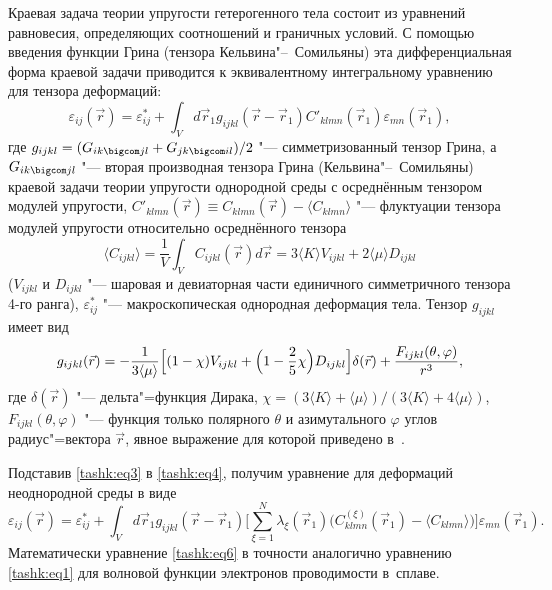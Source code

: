 Краевая задача теории упругости гетерогенного тела состоит из уравнений
равновесия, определяющих соотношений и граничных условий. С помощью введения
функции Грина (тензора Кельвина"--~Сомильяны) эта дифференциальная форма
краевой задачи приводится к эквивалентному интегральному уравнению для
тензора деформаций:
\begin{equation}
\label{tashk:eq4}
\varepsilon _{ij} (\vec {r})=\varepsilon _{ij}^\ast +\int_V d\vec
{r}_1 g_{ijkl} (\vec {r}-\vec {r}_1 )C'_{klmn} (\vec {r}_1 ) \varepsilon
_{mn} (\vec {r}_1 ),
\end{equation}
где $g_{ijkl} =(G_{ik\bigcom jl} +G_{jk\bigcom  il})/2$ "--- симметризованный тензор Грина, 
а $G_{ik \bigcom jl}$ "--- вторая производная тензора Грина (Кельвина"--~Сомильяны) краевой задачи теории упругости однородной среды с осреднённым тензором модулей упругости, ${C}'_{klmn} (\vec {r})\equiv
C_{klmn} (\vec {r})-\langle C_{klmn} \rangle $ "--- флуктуации тензора модулей
упругости относительно осреднённого тензора 
$$\langle C_{ijkl} \rangle
=\frac{1}{V}\int_V C_{ijkl} (\vec {r})d\vec {r} =3\langle K\rangle
 V_{ijkl} +2\langle \mu \rangle D_{ijkl}$$ ($V_{ijkl}$ и
$D_{ijkl}$ "--- шаровая и девиаторная части единичного симметричного тензора
4-го ранга), $\varepsilon _{ij}^\ast $ "--- макроскопическая однородная
деформация тела. Тензор $g_{ijkl}$ имеет вид
\begin{equation}
\label{tashk:eq5}
g_{ijkl} (\vec {r})=-\frac{1}{3\langle \mu \rangle }\Bigl[(1-\chi
)V_{ijkl} +\Bigl(1-\frac{2}{5}\chi \Bigr)D_{ijkl} \Bigr]\delta (\vec
{r})+\frac{F_{ijkl}(\theta ,\varphi )}{r^3},
\end{equation}
где $\delta (\vec {r})$ "--- дельта"=функция Дирака, $\chi =(3\langle
K\rangle +\langle \mu \rangle)/(3\langle K\rangle +4\langle \mu \rangle)$,
$F_{ijkl} (\theta ,\varphi )$ "--- функция только полярного $\theta$ и азимутального $\varphi$  углов
радиус"=вектора $\vec {r}$, явное выражение для которой приведено в~\cite{tashk:bib4}.

Подставив \eqref{tashk:eq3} в \eqref{tashk:eq4}, получим уравнение для деформаций неоднородной среды в
виде
\begin{equation}
\label{tashk:eq6}
\varepsilon _{ij} (\vec {r})=\varepsilon _{ij}^\ast + \int _V d\vec {r}_1 g_{ijkl} (\vec {r}-\vec {r}_1) \biggl[ \sum\limits_{\xi =1}^N \lambda_\xi (\vec {r}_1 )\bigl( C_{klmn}^{(\xi )} (\vec {r}_1 )-\langle C_{klmn} \rangle \bigr) \biggr]\varepsilon _{mn} (\vec {r}_1).
\end{equation}
Математически уравнение \eqref{tashk:eq6} в точности аналогично уравнению \eqref{tashk:eq1} для волновой функции электронов проводимости в~сплаве.

